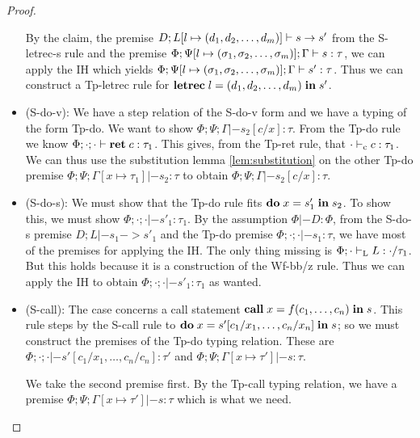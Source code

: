 \documentclass[a4paper, oneside, 10pt, final]{memoir}
\begin{document}
\begin{proof}
\begin{itemize}
    By the claim, the premise $D;L[l\mapsto (d_1, d_2, \dotsc, d_m)] |- s -> s'$
    from the S-letrec-s rule and the premise $\Phi;\Psi[l \mapsto
    (\sigma_1, \sigma_2, \dotsc, \sigma_m)];\Gamma |- s : \tau$, we can apply the IH which yields $\Phi;\Psi[l \mapsto
    (\sigma_1, \sigma_2, \dotsc, \sigma_m)];\Gamma |- s' : \tau$. Thus we can construct a Tp-letrec
    rule for $\mathbf{letrec} \; l = (d_1, d_2, \dotsc, d_m) \; \mathbf{in} \; s'$.
  \item (S-do-v):
    We have a step relation of the S-do-v form and we have a typing of
    the form Tp-do. We want to show $\Phi;\Psi;\Gamma |- s_2[c/x] :
    \tau$. From the Tp-do rule we know $\Phi;\cdot;\cdot |- \mathbf{ret} \; c :
    \tau_1$. This gives, from the Tp-ret rule, that $\cdot |-_{\mathrm{c}} c :
    \tau_1$. We can thus use the substitution lemma
    \ref{lem:substitution} on the other Tp-do premise
    $\Phi;\Psi;\Gamma[x \mapsto \tau_1] |- s_2 : \tau$ to obtain
    $\Phi;\Psi;\Gamma |- s_2[c/x] : \tau$.
  \item (S-do-s): We must show that the Tp-do rule fits
    $\mathbf{do} \; x = s'_1 \; \mathbf{in} \; s_2$. To show this, we must show $\Phi;\cdot;\cdot
    |- s'_1 : \tau_1$. By the assumption $\Phi |- D : \Phi$, from the
    S-do-s premise $D;L |- s_1 -> s'_1$ and the Tp-do premise
    $\Phi;\cdot;\cdot |- s_1 : \tau$, we have most of the premises for
    applying the IH. The only thing missing is $\Phi;\cdot |-_{\mathrm{L}} L :
    \cdot / \tau_1$. But this holds because it is a construction of the
    Wf-bb/z rule. Thus we can apply the IH to obtain $\Phi;\cdot;\cdot
    |- s'_1 : \tau_1$ as wanted.
  \item (S-call):
    The case concerns a call statement
    $\mathbf{call} \; x = f (c_1,\dotsc,c_n)\; \mathbf{in} \; s$. This rule steps by the S-call
    rule to $\mathbf{do} \; x = s'[c_1/x_1,\dotsc,c_n/x_n] \; \mathbf{in} \; s$; so we
    must construct the premises of the Tp-do typing relation. These are
    $\Phi;\cdot;\cdot |- s'[c_1/x_1,\dotsc,c_n/c_n] : \tau'$ and
    $\Phi;\Psi;\Gamma[x \mapsto  \tau'] |- s : \tau$.

    We take the second premise first. By the Tp-call typing relation, we
    have a premise $\Phi;\Psi;\Gamma[x \mapsto \tau'] |- s : \tau$
    which is what we need.


\end{itemize}
\end{proof}
\end{document}

